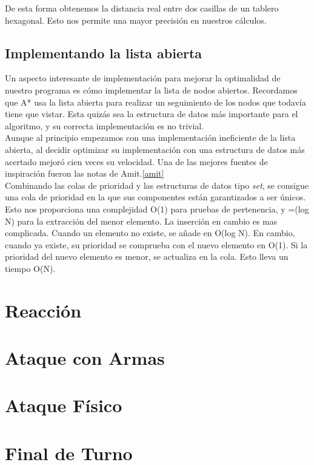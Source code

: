 \documentclass[a4paper,12pt,oneside]{book}
\begin{document}
De esta forma obtenemos la distancia real entre dos casillas de un tablero
hexagonal. Esto nos permite una mayor precisión en nuestros cálculos.

\subsection{Implementando la lista abierta}

Un aspecto interesante de implementación para mejorar la optimalidad
de nuestro programa es cómo implementar la lista de nodos
abiertos. Recordamos que A* usa la lista abierta para realizar un
seguimiento de los nodos que todavía tiene que vistar. Esta quizás sea
la estructura de datos más importante para el algoritmo, y su correcta
implementación es no trivial.\\

Aunque al principio empezamos con una implementación ineficiente de la
lista abierta, al decidir optimizar su implementación con una
estructura de datos más acertado mejoró cien veces su velocidad. Una
de las mejores fuentes de inspiración fueron las notas de
Amit.\ref{amit} \\

Combinando las colas de prioridad y las estructuras de datos tipo {\it
  set}, se consigue una cola de prioridad en la que sus componentes
están garantizados a ser únicos. \\

Esto nos proporciona una complejidad O(1) para pruebas de pertenencia,
y =(log N) para la extracción del menor elemento. La inserción en
cambio es mas complicada. Cuando un elemento no existe, se añade en
O(log N). En cambio, cuando ya existe, su prioridad se comprueba con
el nuevo elemento en O(1). Si la prioridad del nuevo elemento es
menor, se actualiza en la cola. Esto lleva un tiempo O(N).

\section{Reacción}
\section{Ataque con Armas}
\section{Ataque Físico}
\section{Final de Turno}
\end{document}
